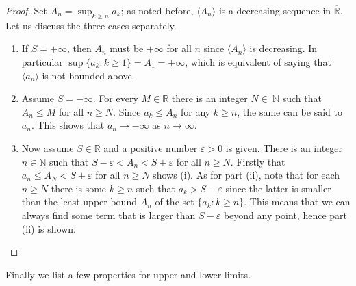 \begin{proof}
Set $A_n = \displaystyle \sup_{k \geqslant n} a_k$; as noted before, $\langle A_n \rangle$ is a decreasing sequence in $\overline{\mathbb{R}}$.  Let us discuss the three cases separately.
  \begin{enumerate}[(1)]
    \item If $S = +\infty$, then $A_n$ must be $+\infty$ for all $n$ since $\langle A_n \rangle$ is decreasing.  In particular $\sup \{ a_k \colon k \geqslant 1 \} = A_1 = +\infty$, which is equivalent of saying that $\langle a_n \rangle$ is not bounded above.
    \item Assume $S = -\infty$.  For every $M \in \mathbb{R}$ there is an integer $N \in ~\mathbb{N}$ such that $A_n \leqslant M$ for all $n \geqslant N$.  Since $a_k \leqslant A_n$ for any $k \geqslant n$, the same can be said to $a_n$.  This shows that $a_n \to -\infty$ as $n \to \infty$.
    \item Now assume $S \in \mathbb{R}$ and a positive number $\varepsilon > 0$ is given.  There is an integer $n \in \mathbb{N}$ such that $S - \varepsilon < A_n < S + \varepsilon$ for all $n \geqslant N$.  Firstly that $a_n \leqslant A_N < S + \varepsilon$ for all $n \geqslant N$ shows (i).  As for part (ii), note that for each $n \geqslant N$ there is some $k \geqslant n$ such that $a_k > S - \varepsilon$ since the latter is smaller than the least upper bound $A_n$ of the set $\{ a_k \colon k \geqslant n \}$.  This means that we can always find some term that is larger than $S - \varepsilon$ beyond any point, hence part (ii) is shown.
  \end{enumerate}
\end{proof}

Finally we list a few properties for upper and lower limits.

